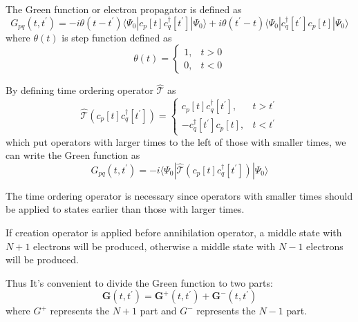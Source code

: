 The Green function or electron propagator is defined as
\begin{equation} \label{eq:greendef}
G_{p q}\left(t, t^{\prime}\right)=-i \theta\left(t-t^{\prime}\right)\langle\Psi_{0}|c_{p}[t] c_{q}^{\dagger}\left[t^{\prime}\right]| \Psi_{0}\rangle+ i \theta\left(t^{\prime}-t\right)\langle\Psi_{0}|c_{q}^{\dagger}\left[t^{\prime}\right] c_{p}[t]| \Psi_{0}\rangle
\end{equation}
where $\theta(t)$ is step function defined as
\begin{equation}
\theta(t)=\left\{\begin{array}{ll}{1,} & {t>0} \\ {0,} & {t<0}\end{array}\right.
\end{equation}

By defining time ordering operator $\hat{\mathcal{T}}$ as
\begin{equation}
\hat{\mathcal{T}}\left(c_{p}[t] c_{q}^{\dagger}\left[t^{\prime}\right]\right)=\left\{\begin{array}{cc}{c_{p}[t] c_{q}^{\dagger}\left[t^{\prime}\right],} & {t>t^{\prime}} \\ {-c_{q}^{\dagger}\left[t^{\prime}\right] c_{p}[t],} & {t<t^{\prime}}\end{array}\right.
\end{equation}
which put operators with larger times to the left of those with smaller times,
we can write the Green function as
\begin{equation}
G_{p q}\left(t, t^{\prime}\right)=-i\langle\Psi_{0}|\hat{\mathcal{T}}\left(c_{p}[t] c_{q}^{\dagger}\left[t^{\prime}\right]\right)| \Psi_{0}\rangle
\end{equation}

The time ordering operator is necessary since operators with smaller times should be applied to states earlier than those with larger times.

If creation operator is applied before annihilation operator, a middle state with $N+1$ electrons will be produced, otherwise a middle state with $N-1$ electrons will be produced.

Thus It's convenient to divide the Green function to two parts:
\begin{equation}
\boldsymbol{G}\left(t, t^{\prime}\right)=\boldsymbol{G}^{+}\left(t, t^{\prime}\right)+\boldsymbol{G}^{-}\left(t, t^{\prime}\right)
\end{equation}
where $G^{+}$ represents the $N+1$ part and $G^{-}$ represents the $N-1$ part.

